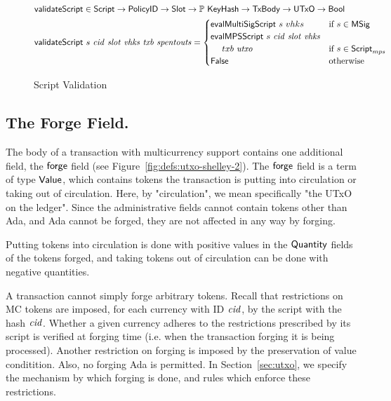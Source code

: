 \begin{figure*}[htb]
    \begin{align*}
      \mathsf{validateScript} & \in\mathsf{Script}\to\mathsf{PolicyID}\to\mathsf{Slot}\to
      \mathbb{P}~\mathsf{KeyHash}\to\mathsf{TxBody}\to\mathsf{UTxO}\to\mathsf{Bool} \\
      \mathsf{validateScript} & ~s~\mathit{cid}~\mathit{slot}~\mathit{vhks}
       ~\mathit{txb}~\mathit{spentouts} =
                             \begin{cases}
                               \mathsf{evalMultiSigScript}~s~vhks & \text{if}~s \in\mathsf{MSig} \\
                               \mathsf{evalMPSScript}~s~\mathit{cid}~\mathit{slot}~\mathit{vhks} \\
                                ~~~~txb~\mathit{utxo} & \text{if}~s \in\mathsf{Script}_{mps} \\
                               \mathsf{False} & \text{otherwise}
                             \end{cases} \\
    \end{align*}
  \caption{Script Validation}
  \label{fig:defs:tx-mc-valid}
\end{figure*}

\subsection*{The Forge Field.}

The body of a transaction with multicurrency support contains one additional
field, the $\mathsf{forge}$ field (see Figure~\ref{fig:defs:utxo-shelley-2}).
The $\mathsf{forge}$ field is a term of type $\mathsf{Value}$, which contains
tokens the transaction is putting into circulation or taking out of
circulation. Here, by "circulation", we mean specifically "the UTxO on the
ledger". Since the administrative fields cannot contain tokens other than Ada,
and Ada cannot be forged, they are not affected in any way by forging.

Putting tokens into circulation is done with positive values in the $\mathsf{Quantity}$
fields of the tokens forged, and taking tokens out of circulation can be done
with negative quantities.

A transaction cannot simply forge arbitrary tokens. Recall that restrictions on
MC tokens are imposed, for each currency with ID $\mathit{cid}$, by the script
with the hash $\mathit{cid}$. Whether a given currency adheres to the restrictions
prescribed by its script is verified at forging time (i.e. when the transaction
forging it is being processed). Another restriction on forging is imposed by
the preservation of value conditition. Also, no forging Ada
is permitted. In Section~\ref{sec:utxo}, we specify the mechanism by which
forging is done, and rules which enforce these restrictions.


